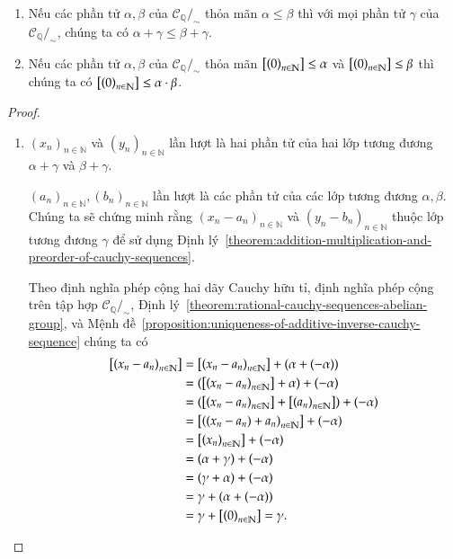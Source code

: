 \begin{theorem}
    \begin{enumerate}[label={(\roman*)}]
        \item Nếu các phần tử $\alpha, \beta$ của $\mathscr{C}_{\mathbb{Q}}/_{\sim}$ thỏa mãn $\alpha\leq \beta$ thì với mọi phần tử $\gamma$ của $\mathscr{C}_{\mathbb{Q}}/_{\sim}$, chúng ta có $\alpha + \gamma\leq \beta + \gamma$.
        \item Nếu các phần tử $\alpha, \beta$ của $\mathscr{C}_{\mathbb{Q}}/_{\sim}$ thỏa mãn $\left[{\left({0}\right)}_{{n}\in\mathbb{N}}\right] \leq \alpha$ và $\left[{\left({0}\right)}_{{n}\in\mathbb{N}}\right]\leq \beta$ thì chúng ta có $\left[{\left({0}\right)}_{{n}\in\mathbb{N}}\right]\leq \alpha\cdot\beta$.
    \end{enumerate}
\end{theorem}

\begin{proof}
    \begin{enumerate}[label={(\roman*)}]
        \item ${(x_{n})}_{n\in\mathbb{N}}$ và ${(y_{n})}_{n\in\mathbb{N}}$ lần lượt là hai phần tử của hai lớp tương đương $\alpha + \gamma$ và $\beta + \gamma$.

              ${(a_{n})}_{n\in\mathbb{N}}, {(b_{n})}_{n\in\mathbb{N}}$ lần lượt là các phần tử của các lớp tương đương $\alpha, \beta$. Chúng ta sẽ chứng minh rằng ${(x_{n} - a_{n})}_{n\in\mathbb{N}}$ và ${(y_{n} - b_{n})}_{n\in\mathbb{N}}$ thuộc lớp tương đương $\gamma$ để sử dụng Định lý~\ref{theorem:addition-multiplication-and-preorder-of-cauchy-sequences}.

              Theo định nghĩa phép cộng hai dãy Cauchy hữu tỉ, định nghĩa phép cộng trên tập hợp $\mathscr{C}_{\mathbb{Q}}/_{\sim}$, Định lý~\ref{theorem:rational-cauchy-sequences-abelian-group}, và Mệnh đề~\ref{proposition:uniqueness-of-additive-inverse-cauchy-sequence} chúng ta có
              \begin{align*}
                  \left[{\left({x_{n} - a_{n}}\right)}_{{n}\in\mathbb{N}}\right] & = \left[{\left({x_{n} - a_{n}}\right)}_{{n}\in\mathbb{N}}\right] + (\alpha + (-\alpha))            \\
                                            & = (\left[{\left({x_{n} - a_{n}}\right)}_{{n}\in\mathbb{N}}\right] + \alpha) + (-\alpha)            \\
                                            & = (\left[{\left({x_{n} - a_{n}}\right)}_{{n}\in\mathbb{N}}\right] + \left[{\left({a_{n}}\right)}_{{n}\in\mathbb{N}}\right]) + (-\alpha) \\
                                            & = \left[{\left({(x_{n} - a_{n}) + a_{n}}\right)}_{{n}\in\mathbb{N}}\right] + (-\alpha)             \\
                                            & = \left[{\left({x_{n}}\right)}_{{n}\in\mathbb{N}}\right] + (-\alpha)                               \\
                                            & = (\alpha + \gamma) + (-\alpha)                               \\
                                            & = (\gamma + \alpha) + (-\alpha)                               \\
                                            & = \gamma + (\alpha + (-\alpha))                               \\
                                            & = \gamma + \left[{\left({0}\right)}_{{n}\in\mathbb{N}}\right] = \gamma.
              \end{align*}


\end{enumerate}
\end{proof}
